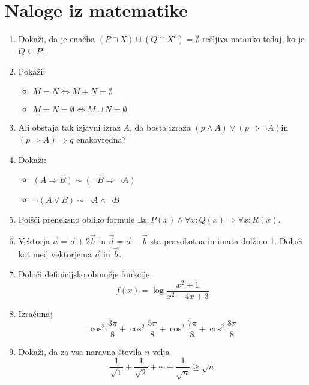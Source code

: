 \documentclass[a4paper,12pt]{article}
\begin{document}
\section*{Naloge iz matematike}


\begin{enumerate}
    \item Dokaži, da je enačba \((P \cap X) \cup (Q \cap X^{c}) = \emptyset\) rešljiva natanko tedaj, ko je \(Q \subseteq P^{c}\).

    \item {
        Pokaži: 
        \begin{itemize}
            \item  \(M = N \iff M + N = \emptyset\)
            \item \(M = N = \emptyset \iff M \cup N = \emptyset\)
        \end{itemize}
   }

    \item Ali obstaja tak izjavni izraz \(A\), da bosta izraza \((p \wedge A) \lor (p \Rightarrow \neg{A})\)in \((p \Rightarrow A) \Rightarrow q\) enakovredna?


    \item {
        Dokaži:
        \begin{itemize}
            \item \((A \Rightarrow B) \sim (\neg{B} \Rightarrow \neg{A})\)
            \item \(\neg{(A \vee B)} \sim \neg{A} \wedge \neg{B}\)
        \end{itemize}
    }

    \item Poišči preneksno obliko formule \(\exists{x} : P(x) \wedge \forall{x} : Q(x) \Rightarrow \forall{x} : R(x)\).

    \item Vektorja \(\vec{a} = \vec{a} + 2\vec{b}\) in \(\vec{d} = \vec{a} - \vec{b}\) sta pravokotna in imata dolžino 1. Določi kot med vektorjema \(\vec{a}\) in \(\vec{b}\).

    \item Določi definicijsko območje funkcije 
        \[f(x) = \log{\frac{x^2 + 1}{x^2 - 4x + 3}}\]

    \item Izračunaj 
    \[
        \cos^2\frac{3\pi}{8} + \cos^2\frac{5\pi}{8} + \cos^2\frac{7\pi}{8} + \cos^2\frac{8\pi}{8}
    \]

    \item Dokaži, da za vsa naravna števila $n$ velja
         \[
            \frac{1}{\sqrt{1}} + \frac{1}{\sqrt{2}} + \cdots{} + \frac{1}{\sqrt{n}} \geq \sqrt{n}
         \]


\end{enumerate}
\end{document}
